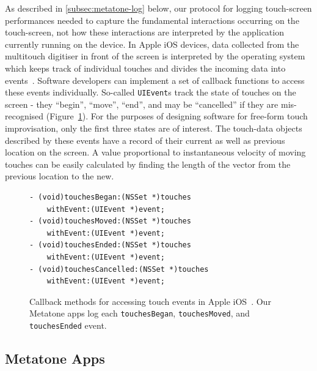 \documentclass[graybox]{svmult}
\begin{document}
As described in \ref{subsec:metatone-log} below, our protocol for
logging touch-screen performances needed to capture the fundamental
interactions occurring on the touch-screen, not how these interactions
are interpreted by the application currently running on the device. In
Apple iOS devices, data collected from the multitouch digitiser in
front of the screen is interpreted by the operating system which keeps
track of individual touches and divides the incoming data into
events~\cite{AppleDeveloper:2015rm}. Software developers can implement
a set of callback functions to access these events individually.
So-called \texttt{UIEvent}s track the state of touches on the screen -
they ``begin'', ``move'', ``end'', and may be ``cancelled'' if they
are mis-recognised (Figure~\ref{touch-event-code-listing}). For the purposes of designing software for
free-form touch improvisation, only the first three states are of
interest. The touch-data objects described by these events have a
record of their current as well as previous location on the screen. A
value proportional to instantaneous velocity of moving touches can be
easily calculated by finding the length of the vector from the
previous location to the new.

\begin{figure}
\begin{verbatim}
- (void)touchesBegan:(NSSet *)touches 
    withEvent:(UIEvent *)event;
- (void)touchesMoved:(NSSet *)touches 
    withEvent:(UIEvent *)event;
- (void)touchesEnded:(NSSet *)touches 
    withEvent:(UIEvent *)event;
- (void)touchesCancelled:(NSSet *)touches 
    withEvent:(UIEvent *)event;
\end{verbatim}
  \caption{Callback methods for accessing touch events in Apple
    iOS~\cite{AppleDeveloper:2015rm}. Our Metatone apps log each
    \texttt{touchesBegan}, \texttt{touchesMoved}, and
    \texttt{touchesEnded} event.}
\label{touch-event-code-listing}
\end{figure}

\subsection{Metatone Apps}
\label{subsec:metatone-apps}
\end{document}
